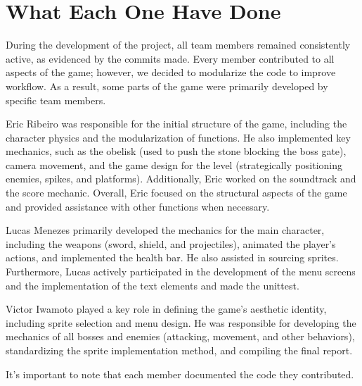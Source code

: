 \section{What Each One Have Done}

During the development of the project, all team members remained consistently active, as evidenced by the commits made. Every member contributed to all aspects of the game; however, we decided to modularize the code to improve workflow. As a result, some parts of the game were primarily developed by specific team members.

Eric Ribeiro was responsible for the initial structure of the game, including the character physics and the modularization of functions. He also implemented key mechanics, such as the obelisk (used to push the stone blocking the boss gate), camera movement, and the game design for the level (strategically positioning enemies, spikes, and platforms). Additionally, Eric worked on the soundtrack and the score mechanic. Overall, Eric focused on the structural aspects of the game and provided assistance with other functions when necessary.

Lucas Menezes primarily developed the mechanics for the main character, including the weapons (sword, shield, and projectiles), animated the player's actions, and implemented the health bar. He also assisted in sourcing sprites. Furthermore, Lucas actively participated in the development of the menu screens and the implementation of the text elements and made the unittest.

Victor Iwamoto played a key role in defining the game's aesthetic identity, including sprite selection and menu design. He was responsible for developing the mechanics of all bosses and enemies (attacking, movement, and other behaviors), standardizing the sprite implementation method, and compiling the final report.

It's important to note that each member documented the code they contributed.






